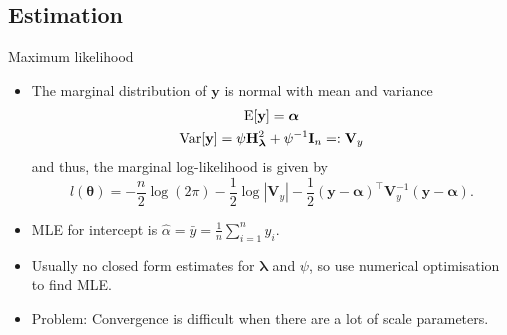 \documentclass{beamer}\usepackage[]{graphicx}\usepackage[]{color}
\newcommand{\E}{\text{\normalfont E}}
\newcommand{\Var}{\text{\normalfont Var}}
\begin{document}
\subsection{Estimation}

\begin{frame}{Maximum likelihood}
	\begin{itemize}
		\item The marginal distribution of $\mathbf y$ is normal with mean and variance
		\begin{align*}
			\begin{gathered}
				\E[\mathbf y] = \boldsymbol\alpha \\
				\Var[\mathbf y] = \psi \mathbf  H_{\boldsymbol\lambda}^2 + \psi^{-1}\mathbf I_n =: \mathbf V_y
			\end{gathered}
		\end{align*}
		and thus, the marginal log-likelihood is given by
		\[
			l(\boldsymbol{\theta}) = - \frac{n}{2} \log(2\pi) - \frac{1}{2} \log | \mathbf V_y | - \frac{1}{2}  (\mathbf y - \boldsymbol\alpha)^\top \mathbf V_y^{-1} (\mathbf y - \boldsymbol\alpha).
		\]

		\item MLE for intercept is $\hat\alpha = \bar y = \frac{1}{n}\sum_{i=1}^n y_i$.
		\item Usually no closed form estimates for $\boldsymbol{\lambda}$ and $\psi$, so use numerical optimisation to find MLE.
		\item Problem: Convergence is difficult when there are a lot of scale parameters.
	\end{itemize}
\end{frame}
\end{document}

